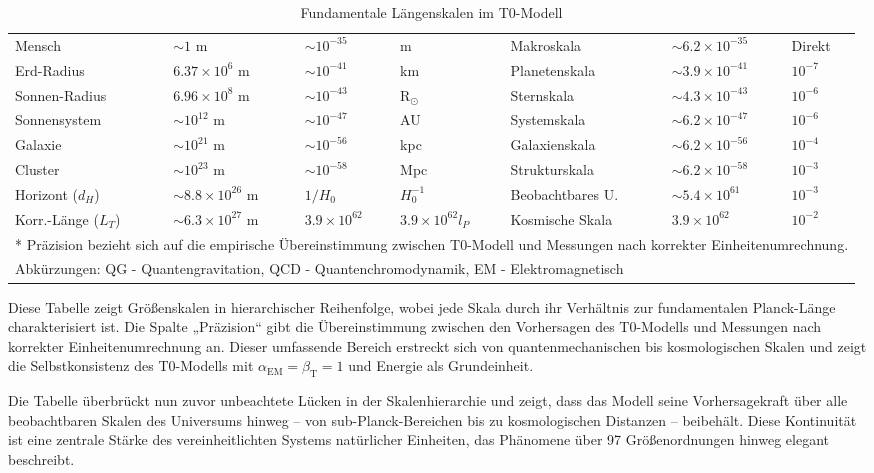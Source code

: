 \documentclass[12pt,a4paper]{article}
\newcommand{\alphaEM}{\alpha_{\text{EM}}}
\newcommand{\betaT}{\beta_{\text{T}}}
\begin{document}
\begin{table}[ht]
\begin{adjustbox}{scale=0.7}
\begin{tabular}{lllllll}
				Mensch & $\sim 1$ m & $\sim 10^{-35}$ & m & Makroskala & $\sim 6.2 \times 10^{-35}$ & Direkt \\
				Erd-Radius & $6.37 \times 10^{6}$ m & $\sim 10^{-41}$ & km & Planetenskala & $\sim 3.9 \times 10^{-41}$ & $10^{-7}$ \\
				Sonnen-Radius & $6.96 \times 10^{8}$ m & $\sim 10^{-43}$ & R$_{\odot}$ & Sternskala & $\sim 4.3 \times 10^{-43}$ & $10^{-6}$ \\
				Sonnensystem & $\sim 10^{12}$ m & $\sim 10^{-47}$ & AU & Systemskala & $\sim 6.2 \times 10^{-47}$ & $10^{-6}$ \\
				Galaxie & $\sim 10^{21}$ m & $\sim 10^{-56}$ & kpc & Galaxienskala & $\sim 6.2 \times 10^{-56}$ & $10^{-4}$ \\
				Cluster & $\sim 10^{23}$ m & $\sim 10^{-58}$ & Mpc & Strukturskala & $\sim 6.2 \times 10^{-58}$ & $10^{-3}$ \\
				Horizont ($d_H$) & $\sim 8.8 \times 10^{26}$ m & $1/H_0$ & $H_0^{-1}$ & Beobachtbares U. & $\sim 5.4 \times 10^{61}$ & $10^{-3}$ \\
				Korr.-Länge ($L_T$) & $\sim 6.3 \times 10^{27}$ m & $3.9 \times 10^{62}$ & $3.9 \times 10^{62} l_P$ & Kosmische Skala & $3.9 \times 10^{62}$ & $10^{-2}$ \\
				\hline
				\multicolumn{7}{l}{* Präzision bezieht sich auf die empirische Übereinstimmung zwischen T0-Modell und Messungen nach korrekter Einheitenumrechnung.} \\
				\multicolumn{7}{l}{Abkürzungen: QG - Quantengravitation, QCD - Quantenchromodynamik, EM - Elektromagnetisch} \\
				\hline
			\end{tabular}
		\end{adjustbox}
		\caption{Fundamentale Längenskalen im T0-Modell}
		\label{tab:length_scales}
	\end{table}
	
	Diese Tabelle zeigt Größenskalen in hierarchischer Reihenfolge, wobei jede Skala durch ihr Verhältnis zur fundamentalen Planck-Länge charakterisiert ist. Die Spalte „Präzision“ gibt die Übereinstimmung zwischen den Vorhersagen des T0-Modells und Messungen nach korrekter Einheitenumrechnung an. Dieser umfassende Bereich erstreckt sich von quantenmechanischen bis kosmologischen Skalen und zeigt die Selbstkonsistenz des T0-Modells mit $\alphaEM = \betaT = 1$ und Energie als Grundeinheit.
	
	Die Tabelle überbrückt nun zuvor unbeachtete Lücken in der Skalenhierarchie und zeigt, dass das Modell seine Vorhersagekraft über alle beobachtbaren Skalen des Universums hinweg – von sub-Planck-Bereichen bis zu kosmologischen Distanzen – beibehält. Diese Kontinuität ist eine zentrale Stärke des vereinheitlichten Systems natürlicher Einheiten, das Phänomene über 97 Größenordnungen hinweg elegant beschreibt.
	
\end{document}
